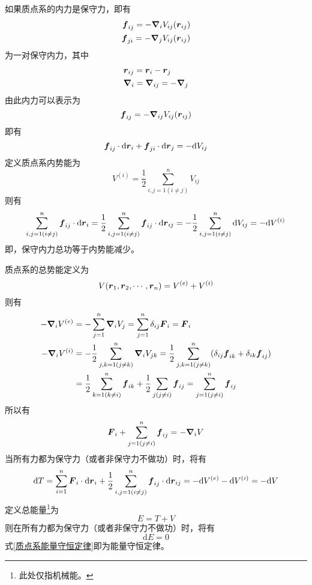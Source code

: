 如果质点系的内力是保守力，即有
\begin{align*}
	\boldsymbol{f}_{ij} = -\boldsymbol{\nabla}_i V_{ij}(\boldsymbol{r}_{ij}) \\
	\boldsymbol{f}_{ji} = -\boldsymbol{\nabla}_j V_{ij}(\boldsymbol{r}_{ij})
\end{align*}
为一对保守内力，其中
\begin{align*}
	& \boldsymbol{r}_{ij} = \boldsymbol{r}_i - \boldsymbol{r}_j \\
	& \boldsymbol{\nabla}_i = \boldsymbol{\nabla}_{ij} = -\boldsymbol{\nabla}_j
\end{align*}
由此内力可以表示为
\begin{equation*}
	\boldsymbol{f}_{ij} = -\boldsymbol{\nabla}_{ij} V_{ij}(\boldsymbol{r}_{ij})
\end{equation*}
即有
\begin{equation}
	\boldsymbol{f}_{ij} \cdot \mathrm{d} \boldsymbol{r}_i + \boldsymbol{f}_{ji} \cdot \mathrm{d} \boldsymbol{r}_j = -\mathrm{d} V_{ij}
\end{equation}
定义{\heiti 质点系内势能}为
\begin{equation}
	V^{(i)} = \frac12 \sum_{i,j=1(i \neq j)}^n V_{ij}
\end{equation}
则有
\begin{equation}
	\sum_{i,j=1(i\neq j)}^n \boldsymbol{f}_{ij} \cdot \mathrm{d} \boldsymbol{r}_i = \frac12 \sum_{i,j=1(i \neq j)}^n \boldsymbol{f}_{ij} \cdot \mathrm{d} \boldsymbol{r}_{ij} = -\frac12 \sum_{i,j=1(i\neq j)}^n \mathrm{d} V_{ij} = -\mathrm{d} V^{(i)}
\end{equation}
即，保守内力总功等于内势能减少。

质点系的总势能定义为
\begin{equation}
	V(\boldsymbol{r}_1,\boldsymbol{r}_2,\cdots,\boldsymbol{r}_n) = V^{(e)} + V^{(i)}
\end{equation}
则有
\begin{align*}
	-\boldsymbol{\nabla}_i V^{(e)} & = -\sum_{j=1}^n \boldsymbol{\nabla}_i V_j = \sum_{j=1}^n \delta_{ij} \boldsymbol{F}_i = \boldsymbol{F}_i \\
	-\boldsymbol{\nabla}_i V^{(i)} & = -\frac12 \sum_{j,k=1(j \neq k)}^n \boldsymbol{\nabla}_i V_{jk} = \frac12 \sum_{j,k=1(j\neq k)}^n (\delta_{ij} \boldsymbol{f}_{ik} + \delta_{ik} \boldsymbol{f}_{ij}) \\
	& = \frac12 \sum_{k=1(k\neq i)}^n \boldsymbol{f}_{ik} + \frac12 \sum_{j(j\neq i)} \boldsymbol{f}_{ij} = \sum_{j=1(j\neq i)}^n \boldsymbol{f}_{ij}
\end{align*}
所以有
\begin{equation}
	\boldsymbol{F}_i + \sum_{j=1(j\neq i)}^n \boldsymbol{f}_{ij} = -\boldsymbol{\nabla}_i V
\end{equation}
当所有力都为保守力（或者非保守力不做功）时，将有
\begin{equation}
	\mathrm{d} T = \sum_{i=1}^n \boldsymbol{F}_i \cdot \mathrm{d} \boldsymbol{r}_i + \frac12 \sum_{i,j=1(i\neq j)}^n \boldsymbol{f}_{ij} \cdot \mathrm{d} \boldsymbol{r}_{ij} = -\mathrm{d} V^{(e)} - \mathrm{d} V^{(i)} = -\mathrm{d} V
\end{equation}
定义{\heiti 总能量}\footnote{此处仅指机械能。}为
\begin{equation}
	E = T+V
\end{equation}
则在所有力都为保守力（或者非保守力不做功）时，将有
\begin{equation}
	\mathrm{d} E = 0
	\label{质点系能量守恒定律}
\end{equation}
式\eqref{质点系能量守恒定律}即为能量守恒定律。

